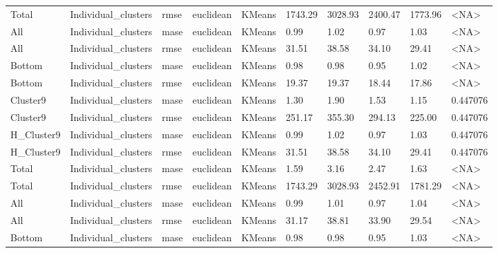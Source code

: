 \begin{tabular}{llllllllll}
      Total & Individual\_clusters &   rmse &  euclidean &        KMeans & 1743.29 &  3028.93 &               2400.47 &       1773.96 &      <NA> \\
        All & Individual\_clusters &   mase &  euclidean &        KMeans &    0.99 &     1.02 &                  0.97 &          1.03 &      <NA> \\
        All & Individual\_clusters &   rmse &  euclidean &        KMeans &   31.51 &    38.58 &                 34.10 &         29.41 &      <NA> \\
     Bottom & Individual\_clusters &   mase &  euclidean &        KMeans &    0.98 &     0.98 &                  0.95 &          1.02 &      <NA> \\
     Bottom & Individual\_clusters &   rmse &  euclidean &        KMeans &   19.37 &    19.37 &                 18.44 &         17.86 &      <NA> \\
   Cluster9 & Individual\_clusters &   mase &  euclidean &        KMeans &    1.30 &     1.90 &                  1.53 &          1.15 &  0.447076 \\
   Cluster9 & Individual\_clusters &   rmse &  euclidean &        KMeans &  251.17 &   355.30 &                294.13 &        225.00 &  0.447076 \\
 H\_Cluster9 & Individual\_clusters &   mase &  euclidean &        KMeans &    0.99 &     1.02 &                  0.97 &          1.03 &  0.447076 \\
 H\_Cluster9 & Individual\_clusters &   rmse &  euclidean &        KMeans &   31.51 &    38.58 &                 34.10 &         29.41 &  0.447076 \\
      Total & Individual\_clusters &   mase &  euclidean &        KMeans &    1.59 &     3.16 &                  2.47 &          1.63 &      <NA> \\
      Total & Individual\_clusters &   rmse &  euclidean &        KMeans & 1743.29 &  3028.93 &               2452.91 &       1781.29 &      <NA> \\
        All & Individual\_clusters &   mase &  euclidean &        KMeans &    0.99 &     1.01 &                  0.97 &          1.04 &      <NA> \\
        All & Individual\_clusters &   rmse &  euclidean &        KMeans &   31.17 &    38.81 &                 33.90 &         29.54 &      <NA> \\
     Bottom & Individual\_clusters &   mase &  euclidean &        KMeans &    0.98 &     0.98 &                  0.95 &          1.03 &      <NA> \\

\end{tabular}
